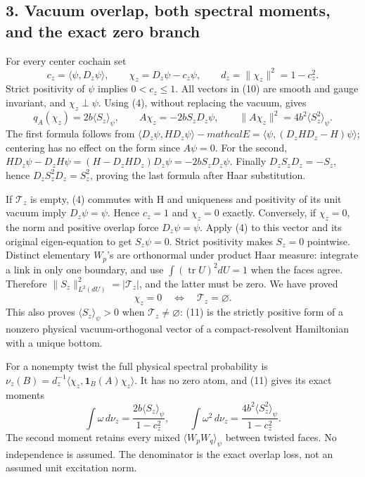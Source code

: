 \documentclass[
  11pt,
]{article}
\begin{document}
\subsection{3. Vacuum overlap, both spectral moments, and the exact zero
branch}\label{magnetic-part-7-vacuum-overlap-both-spectral-moments-and-the-exact-zero-branch}

For every center cochain set \[
 c_z=\langle\psi,D_z\psi\rangle,\qquad
 \chi_z=D_z\psi-c_z\psi,\qquad d_z=\|\chi_z\|^2=1-c_z^2.
\tag{10}
\] Strict positivity of \(\psi\) implies \(0<c_z\leq1\). All vectors in
(10) are smooth and gauge invariant, and \(\chi_z\perp\psi\). Using (4),
without replacing the vacuum, gives \[
 \boxed{q_A(\chi_z)=2b\langle S_z\rangle_\psi,\qquad
        A\chi_z=-2bS_zD_z\psi,\qquad
        \|A\chi_z\|^2=4b^2\langle S_z^2\rangle_\psi.}
\tag{11}
\] The first formula follows from
\(\langle D_z\psi,HD_z\psi\rangle-mathcal E
=\langle\psi,(D_zHD_z-H)\psi\rangle\); centering has no effect on the
form since \(A\psi=0\). For the second,
\(H D_z\psi-D_zH\psi=(H-D_zHD_z)D_z\psi=-2bS_zD_z\psi\). Finally
\(D_zS_zD_z=-S_z\), hence \(D_zS_z^2D_z=S_z^2\), proving the last
formula after Haar substitution.

If \(\mathcal T_z\) is empty, (4) commutes with H and uniqueness and
positivity of its unit vacuum imply \(D_z\psi=\psi\). Hence \(c_z=1\)
and \(\chi_z=0\) exactly. Conversely, if \(\chi_z=0\), the norm and
positive overlap force \(D_z\psi=\psi\). Apply (4) to this vector and
its original eigen-equation to get \(S_z\psi=0\). Strict positivity
makes \(S_z=0\) pointwise. Distinct elementary \(W_p\)'s are orthonormal
under product Haar measure: integrate a link in only one boundary, and
use \(\int(\operatorname{tr}U)^2dU=1\) when the faces agree. Therefore
\(\|S_z\|_{L^2(dU)}^2=|\mathcal T_z|\), and the latter must be zero. We
have proved \[
 \boxed{\chi_z=0\quad\Longleftrightarrow\quad\mathcal T_z=\varnothing.}
\tag{12}
\] This also proves \(\langle S_z\rangle_\psi>0\) when
\(\mathcal T_z\ne\varnothing\): (11) is the strictly positive form of a
nonzero physical vacuum-orthogonal vector of a compact-resolvent
Hamiltonian with a unique bottom.

For a nonempty twist the full physical spectral probability is
\(\nu_z(B)=d_z^{-1}\langle\chi_z,\mathbf1_B(A)\chi_z\rangle\). It has no
zero atom, and (11) gives its exact moments \[
 \boxed{\int\omega\,d\nu_z=
   \frac{2b\langle S_z\rangle_\psi}{1-c_z^2},\qquad
 \int\omega^2\,d\nu_z=
   \frac{4b^2\langle S_z^2\rangle_\psi}{1-c_z^2}.}
\tag{13}
\] The second moment retains every mixed \(\langle W_pW_q\rangle_\psi\)
between twisted faces. No independence is assumed. The denominator is
the exact overlap loss, not an assumed unit excitation norm.
\end{document}
